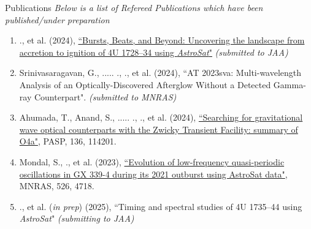 \begin{rSection}{Publications} 
\hspace{-1em} {\textit{Below is a list of Refereed Publications which have been published/under preparation}}
\vspace{-0.5em}
\begin{enumerate}[itemsep=-0.5em, leftmargin=0.5em] %
    \item \me., et al. (2024), {\href{http://arxiv.org/abs/2412.06644}{``Bursts, Beats, and Beyond: Uncovering the landscape from accretion to ignition of 4U 1728--34 using \textit{AstroSat}"}} \textit{(submitted to JAA)}
    \item Srinivasaragavan, G., ..... ., \me., et al. (2024), {``AT 2023sva: Multi-wavelength Analysis of an Optically-Discovered Afterglow Without a Detected Gamma-ray Counterpart"}. \textit{(submitted to MNRAS)}
    \item Ahumada, T., Anand, S., ..... ., \me ., et al. (2024), {\href{https://iopscience.iop.org/article/10.1088/1538-3873/ad8265}{``Searching for gravitational wave optical counterparts with the Zwicky Transient Facility: summary of O4a"}}, PASP, 136, 114201.
    \item Mondal, S., \me., et al. (2023), {\href{https://ui.adsabs.harvard.edu/link_gateway/2023MNRAS.526.4718M/doi:10.1093/mnras/stad3079}{``Evolution of low-frequency quasi-periodic oscillations in GX 339-4 during its 2021 outburst using AstroSat data"}}, MNRAS, 526, 4718. 
    \item \me., et al. (\textit{in prep}) (2025), {``Timing and spectral studies of 4U 1735--44 using \textit{AstroSat}"} \textit{(submitting to JAA)}
\end{enumerate}


\end{rSection}
